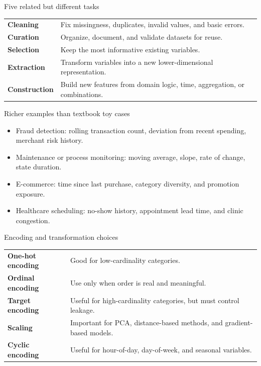 \begin{frame}{Five related but different tasks}
\begin{tabularx}{\textwidth}{>{\bfseries}l X}
Cleaning & Fix missingness, duplicates, invalid values, and basic errors. \\
Curation & Organize, document, and validate datasets for reuse. \\
Selection & Keep the most informative existing variables. \\
Extraction & Transform variables into a new lower-dimensional representation. \\
Construction & Build new features from domain logic, time, aggregation, or combinations. \\
\end{tabularx}
\coursefooter
\end{frame}

\begin{frame}{Richer examples than textbook toy cases}
\begin{itemize}
\item Fraud detection: rolling transaction count, deviation from recent spending, merchant risk history.
\item Maintenance or process monitoring: moving average, slope, rate of change, state duration.
\item E-commerce: time since last purchase, category diversity, and promotion exposure.
\item Healthcare scheduling: no-show history, appointment lead time, and clinic congestion.
\end{itemize}
\coursefooter
\end{frame}

\begin{frame}{Encoding and transformation choices}
\begin{tabularx}{\textwidth}{>{\bfseries}l X}
One-hot encoding & Good for low-cardinality categories. \\
Ordinal encoding & Use only when order is real and meaningful. \\
Target encoding & Useful for high-cardinality categories, but must control leakage. \\
Scaling & Important for PCA, distance-based methods, and gradient-based models. \\
Cyclic encoding & Useful for hour-of-day, day-of-week, and seasonal variables. \\
\end{tabularx}
\coursefooter
\end{frame}


